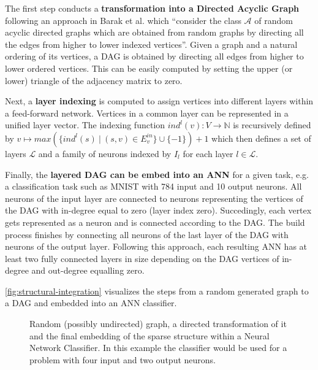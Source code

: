 \documentclass[runningheads]{llncs}
\newcommand{\imagePath}{./}
\begin{document}
\noindent The first step conducts a \textbf{transformation into a Directed Acyclic Graph} following an approach in Barak et al. \cite{barak1984maximal} which ``consider the class $\mathcal{A}$ of random acyclic directed graphs which are obtained from random graphs by directing all the edges from higher to lower indexed vertices''.
Given a graph and a natural ordering of its vertices, a DAG is obtained by directing all edges from higher to lower ordered vertices.
This can be easily computed by setting the upper (or lower) triangle of the adjacency matrix to zero.

\noindent Next, a \textbf{layer indexing} is computed to assign vertices into different layers within a feed-forward network.
Vertices in a common layer can be represented in a unified layer vector.
The indexing function $ind^{l}(v): V \rightarrow \mathbb{N}$ is recursively defined by $v \mapsto max(\{ind^{l}(s) ~|~ (s,v) \in E^{in}_v\} \cup \{-1\}) + 1$ which then defines a set of layers $\mathcal{L}$ and a family of neurons indexed by $I_l$ for each layer $l\in\mathcal{L}$.

\noindent Finally, the \textbf{layered DAG can be embed into an ANN} for a given task, e.g. a classification task such as MNIST with 784 input and 10 output neurons.
All neurons of the input layer are connected to neurons representing the vertices of the DAG with in-degree equal to zero (layer index zero).
Succedingly, each vertex gets represented as a neuron and is connected according to the DAG.
The build process finishes by connecting all neurons of the last layer of the DAG with neurons of the output layer.
Following this approach, each resulting ANN has at least two fully connected layers in size depending on the DAG vertices of in-degree and out-degree equalling zero.

\autoref{fig:structural-integration} visualizes the steps from a random generated graph to a DAG and embedded into an ANN classifier.

\begin{figure}[tb]
	\centering
	\hfill
	\hfill
	\caption{
		Random (possibly undirected) graph, a directed transformation of it and the final embedding of the sparse structure within a Neural Network Classifier.
		In this example the classifier would be used for a problem with four input and two output neurons.
	}
	\label{fig:structural-integration}
\end{figure}
\end{document}
